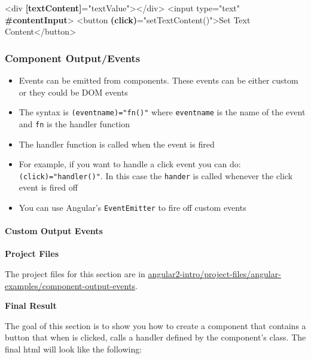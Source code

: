 \documentclass[12pt,]{article}
\newenvironment{Shaded}{}{}
\newcommand{\KeywordTok}[1]{\textcolor[rgb]{0.00,0.00,1.00}{{#1}}}
\newcommand{\StringTok}[1]{\textcolor[rgb]{0.00,0.50,0.50}{{#1}}}
\newcommand{\OtherTok}[1]{\textcolor[rgb]{1.00,0.25,0.00}{{#1}}}
\newcommand{\ErrorTok}[1]{\textcolor[rgb]{1.00,0.00,0.00}{\textbf{{#1}}}}
\newcommand{\NormalTok}[1]{{#1}}
\providecommand{\tightlist}{%
  \setlength{\itemsep}{0pt}\setlength{\parskip}{0pt}}
\let\oldparagraph\paragraph
\renewcommand{\paragraph}[1]{\oldparagraph{#1}\mbox{}}
\begin{document}
\begin{Shaded}
\begin{Highlighting}[numbers=left,,]
\KeywordTok{<div} \ErrorTok{[textContent]}\OtherTok{=}\StringTok{"textValue"}\KeywordTok{></div>}
\KeywordTok{<input}\OtherTok{ type=}\StringTok{"text"} \ErrorTok{#contentInput}\KeywordTok{>}
\KeywordTok{<button} \ErrorTok{(click)}\OtherTok{=}\StringTok{"setTextContent()"}\KeywordTok{>}\NormalTok{Set Text Content}\KeywordTok{</button>}
\end{Highlighting}
\end{Shaded}

\subsubsection{Component Output/Events}\label{component-outputevents}

\begin{itemize}
\tightlist
\item
  Events can be emitted from components. These events can be either
  custom or they could be DOM events
\item
  The syntax is \texttt{(eventname)="fn()"} where \texttt{eventname} is
  the name of the event and \texttt{fn} is the handler function
\item
  The handler function is called when the event is fired
\item
  For example, if you want to handle a click event you can do:
  \texttt{(click)="handler()"}. In this case the \texttt{hander} is
  called whenever the click event is fired off
\item
  You can use Angular's \texttt{EventEmitter} to fire off custom events
\end{itemize}

\paragraph{Custom Output Events}\label{custom-output-events}

\textbf{Project Files}

The project files for this section are in
\href{https://github.com/aminmeyghani/angular2-intro/tree/master/project-files/angular-examples/component-output-events}{angular2-intro/project-files/angular-examples/component-output-events}.

\textbf{Final Result}

The goal of this section is to show you how to create a component that
contains a button that when is clicked, calls a handler defined by the
component's class. The final html will look like the following:
\end{document}
